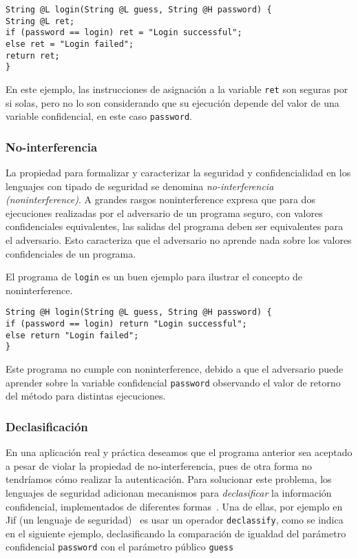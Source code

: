 \begin{lstlisting}
String @L login(String @L guess, String @H password) {
String @L ret;
if (password == login) ret = "Login successful";
else ret = "Login failed";
return ret;
}
\end{lstlisting}

En este ejemplo, las instrucciones de asignación a la variable \texttt{ret} son seguras por si solas, pero no lo son considerando que su ejecución depende del valor de una variable confidencial, en este caso \texttt{password}.

\subsubsection{No-interferencia}
La propiedad para formalizar y caracterizar la seguridad y confidencialidad en los lenguajes con tipado de seguridad se denomina \textit{no-interferencia (noninterference)}. A grandes rasgos noninterference expresa que para dos ejecuciones realizadas por el adversario de un programa seguro, con valores confidenciales equivalentes, las salidas del programa deben ser equivalentes para el adversario. Esto caracteriza que el adversario no aprende nada sobre los valores confidenciales de un programa.

El programa de \texttt{login} es un buen ejemplo para ilustrar el concepto de noninterference.

\begin{lstlisting}
String @H login(String @L guess, String @H password) {
if (password == login) return "Login successful";
else return "Login failed";
}
\end{lstlisting}

Este programa no cumple con noninterference, debido a que el adversario puede aprender sobre la variable confidencial \texttt{password} observando el valor de retorno del método para distintas ejecuciones.

\subsubsection{Declasificación}
En una aplicación real y práctica deseamos que el programa anterior sea aceptado a pesar de violar la propiedad de no-interferencia, pues de otra forma no tendríamos cómo realizar la autenticación. Para solucionar este problema, los lenguajes de seguridad adicionan mecanismos para \textit{declasificar} la información confidencial, implementados de diferentes formas~\cite{sabelfeldSands:JCS09}. Una de ellas, por ejemplo en Jif (un lenguaje de seguridad)~\cite{jif} es usar un operador \texttt{declassify}, como se indica en el siguiente ejemplo, declasificando la comparación de igualdad del parámetro confidencial \texttt{password} con el parámetro público \texttt{guess} %

